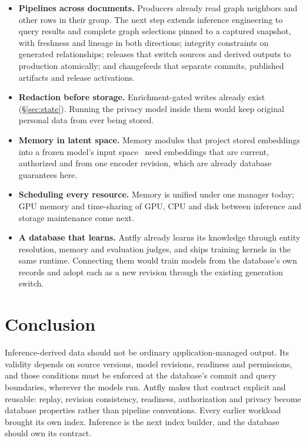 \documentclass[sigconf,nonacm]{acmart}
\begin{document}
\begin{itemize}
  \item \textbf{Pipelines across documents.} Producers already read graph
    neighbors and other rows in their group. The next step extends inference
    engineering to query results and complete graph selections pinned to a
    captured snapshot, with freshness and lineage in both
    directions; integrity constraints on generated relationships; releases
    that switch sources and derived outputs to production atomically; and
    changefeeds that separate commits, published artifacts and release
    activations.
  \item \textbf{Redaction before storage.} Enrichment-gated writes already exist
    (\S\ref{sec:state}). Running the privacy model inside them would keep
    original personal data from ever being stored.
  \item \textbf{Memory in latent space.} Memory modules that project stored
    embeddings into a frozen model's input space~\cite{fallahpour2026memorilla}
    need embeddings that are current, authorized and from one encoder
    revision, which are already database guarantees here.
  \item \textbf{Scheduling every resource.} Memory is unified under one
    manager today; GPU memory and time-sharing of GPU, CPU and disk between
    inference and storage maintenance come next.
  \item \textbf{A database that learns.} Antfly already learns its knowledge
    through entity resolution, memory and evaluation judges, and ships
    training kernels in the same runtime. Connecting them would train models
    from the database's own records and adopt each as a new revision through
    the existing generation switch.
\end{itemize}

\section{Conclusion}

Inference-derived data should not be ordinary application-managed output.
Its validity depends on source versions, model revisions, readiness and
permissions, and those conditions must be enforced at the database's commit
and query boundaries, wherever the models run. Antfly makes that contract
explicit and reusable: replay, revision consistency, readiness,
authorization and privacy become database properties rather than pipeline
conventions. Every earlier workload brought its own index. Inference is the
next index builder, and the database should own its contract.
\end{document}
